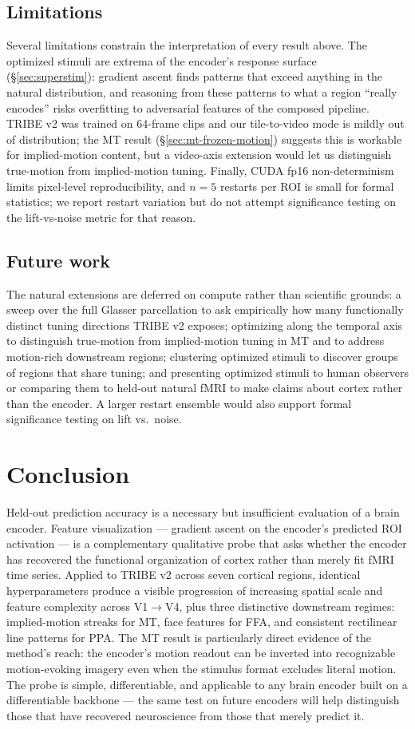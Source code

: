 \documentclass{article}
\begin{document}
\subsection{Limitations}
Several limitations constrain the interpretation of every result above. The optimized stimuli are extrema of the encoder's response surface (\S\ref{sec:superstim}): gradient ascent finds patterns that exceed anything in the natural distribution, and reasoning from these patterns to what a region ``really encodes'' risks overfitting to adversarial features of the composed pipeline. TRIBE v2 was trained on 64-frame clips and our tile-to-video mode is mildly out of distribution; the MT result (\S\ref{sec:mt-frozen-motion}) suggests this is workable for implied-motion content, but a video-axis extension would let us distinguish true-motion from implied-motion tuning. Finally, CUDA fp16 non-determinism limits pixel-level reproducibility, and $n=5$ restarts per ROI is small for formal statistics; we report restart variation but do not attempt significance testing on the lift-vs-noise metric for that reason.

\subsection{Future work}
The natural extensions are deferred on compute rather than scientific grounds: a sweep over the full Glasser parcellation to ask empirically how many functionally distinct tuning directions TRIBE v2 exposes; optimizing along the temporal axis to distinguish true-motion from implied-motion tuning in MT and to address motion-rich downstream regions; clustering optimized stimuli to discover groups of regions that share tuning; and presenting optimized stimuli to human observers or comparing them to held-out natural fMRI to make claims about cortex rather than the encoder. A larger restart ensemble would also support formal significance testing on lift vs.\ noise.

\section{Conclusion}
Held-out prediction accuracy is a necessary but insufficient evaluation of a brain encoder. Feature visualization --- gradient ascent on the encoder's predicted ROI activation --- is a complementary qualitative probe that asks whether the encoder has recovered the functional organization of cortex rather than merely fit fMRI time series. Applied to TRIBE v2 across seven cortical regions, identical hyperparameters produce a visible progression of increasing spatial scale and feature complexity across V1$\to$V4, plus three distinctive downstream regimes: implied-motion streaks for MT, face features for FFA, and consistent rectilinear line patterns for PPA. The MT result is particularly direct evidence of the method's reach: the encoder's motion readout can be inverted into recognizable motion-evoking imagery even when the stimulus format excludes literal motion. The probe is simple, differentiable, and applicable to any brain encoder built on a differentiable backbone --- the same test on future encoders will help distinguish those that have recovered neuroscience from those that merely predict it.
\end{document}
